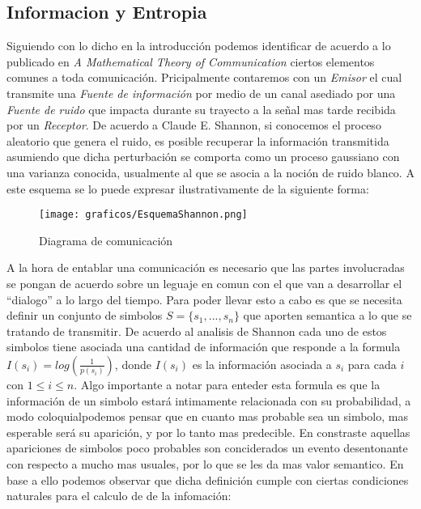 
\subsection{Informacion y Entropia}

Siguiendo con lo dicho en la introducción podemos identificar de acuerdo a lo publicado en \textit{A Mathematical Theory of Communication} ciertos elementos comunes a toda comunicación. Pricipalmente contaremos con un \textit{Emisor} el cual transmite una \textit{Fuente de información} por medio de un canal asediado por una \textit{Fuente de ruido} que impacta durante su trayecto a la señal mas tarde recibida por un \textit{Receptor}. De acuerdo a Claude E. Shannon, si conocemos el proceso aleatorio que genera el ruido, es posible recuperar la información transmitida asumiendo que dicha perturbación se comporta como un proceso gaussiano con una varianza conocida, usualmente al que se asocia a la noción de ruido blanco. A este esquema se lo puede expresar ilustrativamente de la siguiente forma:

\begin{figure}[ht]
\begin{center}
\texttt{[image: graficos/EsquemaShannon.png]}
\caption{Diagrama de comunicación}
\end{center}
\end{figure}


A la hora de entablar una comunicación es necesario que las partes involucradas se pongan de acuerdo sobre un leguaje en comun con el que van a desarrollar el "`dialogo"' a lo largo del tiempo. Para poder llevar esto a cabo es que se necesita definir un conjunto de simbolos $S = \{ s_1, ..., s_n \}$ que aporten semantica a lo que se tratando de transmitir. De acuerdo al analisis de Shannon cada uno de estos simbolos tiene asociada una cantidad de información que responde a la formula $I(s_i) = log(\frac{1}{p(s_i)})$, donde $I(s_i)$ es la información asociada a $s_i$ para cada $i$ con $1 \leq i \leq n$. Algo importante a notar para enteder esta formula es que la información de un simbolo estará intimamente relacionada con su probabilidad, a modo coloquialpodemos pensar que en cuanto mas probable sea un simbolo, mas esperable será su aparición, y por lo tanto mas predecible. En constraste aquellas apariciones de simbolos poco probables son conciderados un evento desentonante con respecto a mucho mas usuales, por lo que se les da mas valor semantico. En base a ello podemos observar que dicha definición cumple con ciertas condiciones naturales para el calculo de de la infomación:

